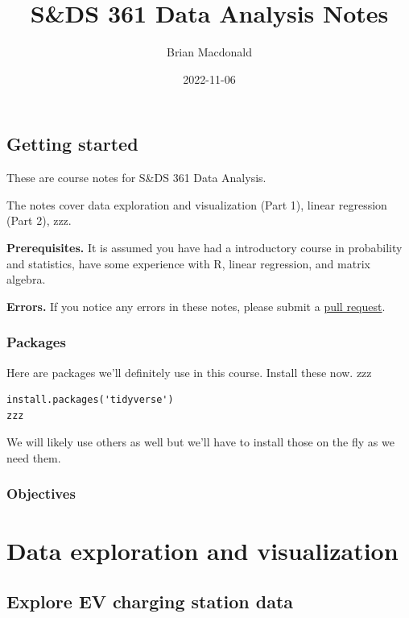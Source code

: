 \documentclass[
]{book}
\title{S\&DS 361 Data Analysis Notes}
\author{Brian Macdonald}
\date{2022-11-06}
\theoremstyle{definition}
\theoremstyle{definition}
\theoremstyle{definition}
\theoremstyle{definition}
\theoremstyle{remark}
\begin{document}
\maketitle

{
\setcounter{tocdepth}{1}
\tableofcontents
}
\hypertarget{getting-started}{%
\chapter{Getting started}\label{getting-started}}

These are course notes for S\&DS 361 Data Analysis.

The notes cover data exploration and visualization (Part 1), linear regression (Part 2), zzz.

\textbf{Prerequisites.} It is assumed you have had a introductory course in probability and statistics, have some experience with R, linear regression, and matrix algebra.

\textbf{Errors.} If you notice any errors in these notes, please submit a \href{https://github.com/bmacGTPM/361/pulls}{pull request}.

\hypertarget{packages}{%
\section{Packages}\label{packages}}

Here are packages we'll definitely use in this course. Install these now. zzz

\begin{verbatim}
install.packages('tidyverse')
zzz
\end{verbatim}

We will likely use others as well but we'll have to install those on the fly as we need them.

\hypertarget{objectives}{%
\section{Objectives}\label{objectives}}

\hypertarget{part-data-exploration-and-visualization}{%
\part{Data exploration and visualization}\label{part-data-exploration-and-visualization}}

\hypertarget{explore-ev-charging-station-data}{%
\chapter{Explore EV charging station data}\label{explore-ev-charging-station-data}}
\end{document}
